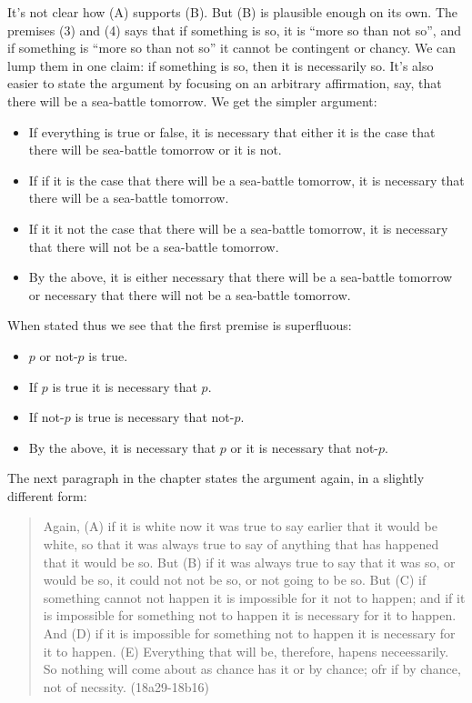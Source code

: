 \documentclass[../../../include/open-logic-section]{subfiles}
\begin{document}
It's not clear how (A) supports (B). But (B) is plausible enough on its own. The premises (3) and (4) says that if something is so, it is ``more so than not so'', and if something is ``more so than not so'' it cannot be contingent or chancy. We can lump them in one claim: if something is so, then it is necessarily so. It's also easier to state the argument by focusing on an arbitrary affirmation, say, that there will be a sea-battle tomorrow. We get the simpler argument:

\begin{itemize}
	\item If everything is true or false, it is necessary that either it is the case that there will be sea-battle tomorrow or it is not.
	\item If if it is the case that there will be a sea-battle tomorrow, it is necessary that there will be a sea-battle tomorrow. 
	\item If it it not the case that there will be a sea-battle tomorrow, it is necessary that there will not be a sea-battle tomorrow.
	\item By the above, it is either necessary that there will be a sea-battle tomorrow or necessary that there will not be a sea-battle tomorrow.
\end{itemize}

When stated thus we see that the first premise is superfluous:

\begin{itemize}
	\item $p$ or not-$p$ is true.
	\item If $p$ is true it is necessary that $p$. 
	\item If not-$p$ is true is necessary that not-$p$.
	\item By the above, it is necessary that $p$ or it is necessary that not-$p$.
\end{itemize}

The next paragraph in the chapter states the argument again, in a slightly different form:

\begin{quote}
	Again, (A) if it is white now it was true to say earlier that it would be white, so that it was always true to say of anything that has happened that it would be so. But (B) if it was always true to say that it was so, or would be so, it could not not be so, or not going to be so. But (C) if something cannot not happen it is impossible for it not to happen; and if it is impossible for something not to happen it is necessary for it to happen. And (D) if it is impossible for something not to happen it is necessary for it to happen. (E) Everything that will be, therefore, hapens neceessarily. So nothing will come about as chance has it or by chance; ofr if by chance, not of necssity. (18a29-18b16)
\end{quote} 
\end{document}
